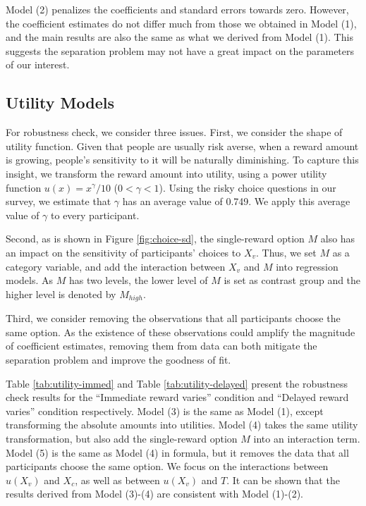 \documentclass[
  12pt,
]{article}
\begin{document}
Model (2) penalizes the coefficients and standard errors towards zero.
However, the coefficient estimates do not differ much from those we
obtained in Model (1), and the main results are also the same as what we
derived from Model (1). This suggests the separation problem may not
have a great impact on the parameters of our interest.

\hypertarget{utility-models}{%
\subsection{Utility Models}\label{utility-models}}

For robustness check, we consider three issues. First, we consider the
shape of utility function. Given that people are usually risk averse,
when a reward amount is growing, people's sensitivity to it will be
naturally diminishing. To capture this insight, we transform the reward
amount into utility, using a power utility function \(u(x)=x^\gamma/10\)
(\(0<\gamma<1\)). Using the risky choice questions in our survey, we
estimate that \(\gamma\) has an average value of 0.749. We apply this
average value of \(\gamma\) to every participant.

Second, as is shown in Figure \ref{fig:choice-sd}, the single-reward
option \(M\) also has an impact on the sensitivity of participants'
choices to \(X_v\). Thus, we set \(M\) as a category variable, and add
the interaction between \(X_v\) and \(M\) into regression models. As
\(M\) has two levels, the lower level of \(M\) is set as contrast group
and the higher level is denoted by \(M_{high}\).

Third, we consider removing the observations that all participants
choose the same option. As the existence of these observations could
amplify the magnitude of coefficient estimates, removing them from data
can both mitigate the separation problem and improve the goodness of
fit.

Table \ref{tab:utility-immed} and Table \ref{tab:utility-delayed}
present the robustness check results for the ``Immediate reward varies''
condition and ``Delayed reward varies'' condition respectively. Model
(3) is the same as Model (1), except transforming the absolute amounts
into utilities. Model (4) takes the same utility transformation, but
also add the single-reward option \(M\) into an interaction term. Model
(5) is the same as Model (4) in formula, but it removes the data that
all participants choose the same option. We focus on the interactions
between \(u(X_v)\) and \(X_c\), as well as between \(u(X_v)\) and \(T\).
It can be shown that the results derived from Model (3)-(4) are
consistent with Model (1)-(2).
\end{document}
